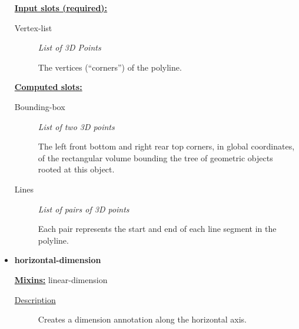 \documentclass [11pt]{book}
\begin{document}
\begin{itemize}
\textbf{
\underline{Input slots (required):}}

\begin{description}

\item [Vertex-list]
\emph{List of 3D Points}

 The vertices (``corners'') of the polyline.




\end{description}






\textbf{
\underline{Computed slots:}}

\begin{description}

\item [Bounding-box]
\emph{List of two 3D points}

 The left front bottom and right rear top corners, in global coordinates,
of the rectangular volume bounding the tree of geometric objects rooted at this object.




\item [Lines]
\emph{List of pairs of 3D points}

 Each pair represents the start and end of each line segment in the polyline.




\end{description}







\item {}
\label{prim:horizontal-dimension}
\textbf{horizontal-dimension}


\textbf{
\underline{Mixins:}} linear-dimension





\begin{description}

\item [
\underline{Description}]


Creates a dimension annotation along the horizontal axis.



\end{description}





\end{itemize}
\end{document}
